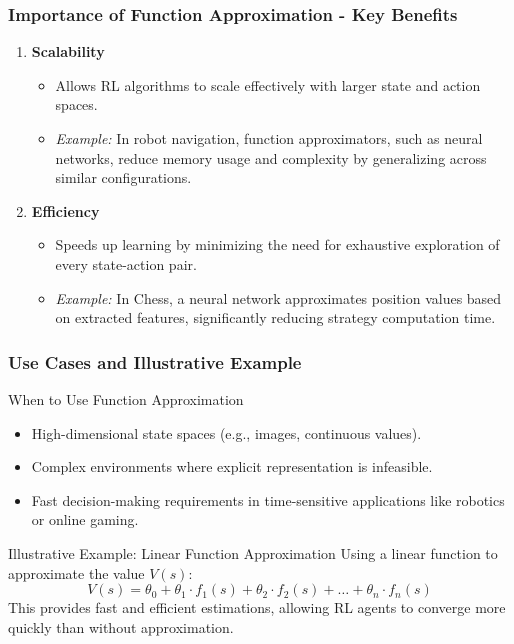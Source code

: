 \documentclass[aspectratio=169]{beamer}
\begin{document}
\begin{frame}[fragile]
    \frametitle{Importance of Function Approximation - Key Benefits}
    \begin{enumerate}
        \item \textbf{Scalability}  
            \begin{itemize}
                \item Allows RL algorithms to scale effectively with larger state and action spaces.
                \item \textit{Example:} In robot navigation, function approximators, such as neural networks, reduce memory usage and complexity by generalizing across similar configurations.
            \end{itemize}
        \item \textbf{Efficiency}
            \begin{itemize}
                \item Speeds up learning by minimizing the need for exhaustive exploration of every state-action pair.
                \item \textit{Example:} In Chess, a neural network approximates position values based on extracted features, significantly reducing strategy computation time.
            \end{itemize}
    \end{enumerate}
\end{frame}

\begin{frame}[fragile]
    \frametitle{Use Cases and Illustrative Example}
    \begin{block}{When to Use Function Approximation}
        \begin{itemize}
            \item High-dimensional state spaces (e.g., images, continuous values).
            \item Complex environments where explicit representation is infeasible.
            \item Fast decision-making requirements in time-sensitive applications like robotics or online gaming.
        \end{itemize}
    \end{block}
    
    \begin{block}{Illustrative Example: Linear Function Approximation}
        Using a linear function to approximate the value \( V(s) \):
        \[
        V(s) = \theta_0 + \theta_1 \cdot f_1(s) + \theta_2 \cdot f_2(s) + \ldots + \theta_n \cdot f_n(s)
        \]
        This provides fast and efficient estimations, allowing RL agents to converge more quickly than without approximation.
    \end{block}
\end{frame}
\end{document}
